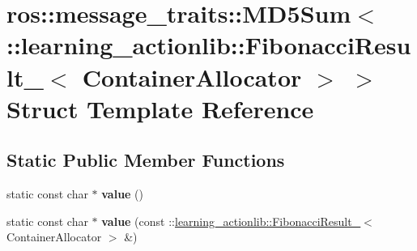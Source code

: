 \hypertarget{structros_1_1message__traits_1_1MD5Sum_3_01_1_1learning__actionlib_1_1FibonacciResult___3_01ContainerAllocator_01_4_01_4}{}\section{ros\+:\+:message\+\_\+traits\+:\+:M\+D5\+Sum$<$ \+:\+:learning\+\_\+actionlib\+:\+:Fibonacci\+Result\+\_\+$<$ Container\+Allocator $>$ $>$ Struct Template Reference}
\label{structros_1_1message__traits_1_1MD5Sum_3_01_1_1learning__actionlib_1_1FibonacciResult___3_01ContainerAllocator_01_4_01_4}
\subsection*{Static Public Member Functions}
\begin{DoxyCompactItemize}
\item 
\mbox{\label{structros_1_1message__traits_1_1MD5Sum_3_01_1_1learning__actionlib_1_1FibonacciResult___3_01ContainerAllocator_01_4_01_4_ab09498aed1cdb0ef79a09fba8ba2e2ea}} 
static const char $\ast$ {\bfseries value} ()
\item 
\mbox{\label{structros_1_1message__traits_1_1MD5Sum_3_01_1_1learning__actionlib_1_1FibonacciResult___3_01ContainerAllocator_01_4_01_4_a9f0691191f1e88b06ddea3146727da07}} 
static const char $\ast$ {\bfseries value} (const \+::\hyperlink{structlearning__actionlib_1_1FibonacciResult__}{learning\+\_\+actionlib\+::\+Fibonacci\+Result\+\_\+}$<$ Container\+Allocator $>$ \&)
\end{DoxyCompactItemize}
